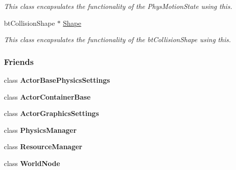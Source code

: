 \begin{DoxyCompactItemize}
\begin{DoxyCompactList}\small\item\em This class encapsulates the functionality of the PhysMotionState using this. \item\end{DoxyCompactList}\item 
\hypertarget{classphys_1_1ActorBase_a643613ce7abb4b6d4352bab036b7cf69}{
btCollisionShape $\ast$ \hyperlink{classphys_1_1ActorBase_a643613ce7abb4b6d4352bab036b7cf69}{Shape}}
\label{classphys_1_1ActorBase_a643613ce7abb4b6d4352bab036b7cf69}

\begin{DoxyCompactList}\small\item\em This class encapsulates the functionality of the btCollisionShape using this. \item\end{DoxyCompactList}\end{DoxyCompactItemize}
\subsubsection*{Friends}
\begin{DoxyCompactItemize}
\item 
\hypertarget{classphys_1_1ActorBase_ad56afa2bffce8b552583041f21297874}{
class {\bfseries ActorBasePhysicsSettings}}
\label{classphys_1_1ActorBase_ad56afa2bffce8b552583041f21297874}

\item 
\hypertarget{classphys_1_1ActorBase_a54042fcfa7ab444a50ec79cbe3395356}{
class {\bfseries ActorContainerBase}}
\label{classphys_1_1ActorBase_a54042fcfa7ab444a50ec79cbe3395356}

\item 
\hypertarget{classphys_1_1ActorBase_a01f5bcaf4807085e756d9c03b3eb8d9d}{
class {\bfseries ActorGraphicsSettings}}
\label{classphys_1_1ActorBase_a01f5bcaf4807085e756d9c03b3eb8d9d}

\item 
\hypertarget{classphys_1_1ActorBase_a139cf05ac01161b7071c8a037c841683}{
class {\bfseries PhysicsManager}}
\label{classphys_1_1ActorBase_a139cf05ac01161b7071c8a037c841683}

\item 
\hypertarget{classphys_1_1ActorBase_a54c1252abc87a78a301e6b6984470408}{
class {\bfseries ResourceManager}}
\label{classphys_1_1ActorBase_a54c1252abc87a78a301e6b6984470408}

\item 
\hypertarget{classphys_1_1ActorBase_a1cacd07efb11226da49a7c80569b18e8}{
class {\bfseries WorldNode}}
\label{classphys_1_1ActorBase_a1cacd07efb11226da49a7c80569b18e8}

\end{DoxyCompactItemize}


